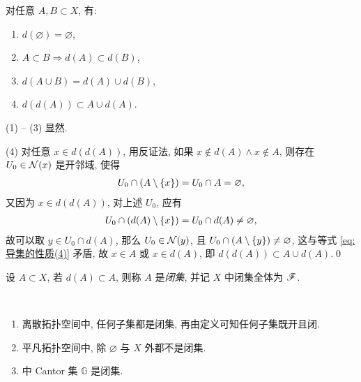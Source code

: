     \begin{Proposition}[导集的性质]
        对任意 $ A, B\subset X $, 有:
        \begin{enumerate}
            \item $ d(\varnothing)=\varnothing $,
            \item $ A\subset B\Longrightarrow d(A)\subset d(B) $,
            \item $ d(A\cup B)=d(A)\cup d(B) $,
            \item $ d(d(A))\subset A\cup d(A) $.
        \end{enumerate}
    \end{Proposition}
    \begin{Proof}
        (1) -- (3) 显然. 

        (4) 对任意 $ x\in d(d(A)) $, 用反证法, 如果 $ x\notin d(A)\land x\notin A $, 则存在 $ U_{0}\in \mathcal{N}(x) $ 是开邻域, 使得
        \begin{align}\label{eq:导集的性质(4)}
            U_{0}\cap(A\setminus\left\{ x \right\})=U_{0}\cap A=\varnothing,
        \end{align}
        又因为 $ x\in d(d(A)) $, 对上述 $ U_{0} $, 应有
        \begin{align*}
            U_{0}\cap(d(A)\setminus\left\{ x \right\})=U_{0}\cap d(A)\ne \varnothing,
        \end{align*}
        故可以取 $ y\in U_{0}\cap d(A) $, 那么 $ U_{0}\in \mathcal{N}(y) $, 且 $ U_{0}\cap(A\setminus\left\{ y \right\})\ne \varnothing $, 这与等式 \eqref{eq:导集的性质(4)} 矛盾, 故 $ x\in A $ 或 $ x\in d(A) $, 即 $ d(d(A))\subset A\cup d(A) $.\qed
    \end{Proof}

    \begin{Definition}[闭集]
        设 $ A\subset X $, 若 $ d(A)\subset A $, 则称 $ A $ 是\emph{闭集}, 并记 $ X $ 中闭集全体为 $ \mathscr{F} $. 
    \end{Definition}
    
    \begin{Example}
        ~
        \begin{enumerate}
            \item 离散拓扑空间中, 任何子集都是闭集, 再由定义可知任何子集既开且闭. 
            \item 平凡拓扑空间中, 除 $ \varnothing $ 与 $ X $ 外都不是闭集. 
            \item \R 中 Cantor 集 $ \mathbb{G} $ 是闭集.
        \end{enumerate}
    \end{Example}

